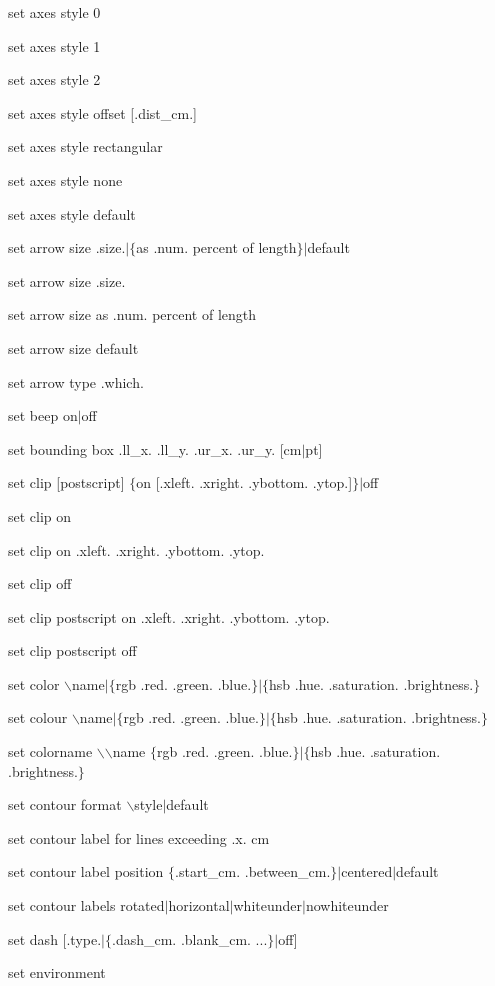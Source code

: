 set axes style 0

set axes style 1

set axes style 2

set axes style offset [.dist\_cm.]

set axes style rectangular

set axes style none

set axes style default

set arrow size .size.$\mid$$\lbrace$as .num. percent of length$\rbrace$$\mid$default

set arrow size .size.

set arrow size as .num. percent of length

set arrow size default

set arrow type .which.

set beep on$\mid$off

set bounding box .ll\_x. .ll\_y. .ur\_x. .ur\_y. [cm$\mid$pt]

set clip [postscript] $\lbrace$on [.xleft. .xright. .ybottom. .ytop.]$\rbrace$$\mid$off

set clip on

set clip on .xleft. .xright. .ybottom. .ytop.

set clip off

set clip postscript on .xleft. .xright. .ybottom. .ytop.

set clip postscript off

set color $\backslash$name$\mid$$\lbrace$rgb .red. .green. .blue.$\rbrace$$\mid$$\lbrace$hsb .hue. .saturation. .brightness.$\rbrace$

set colour $\backslash$name$\mid$$\lbrace$rgb .red. .green. .blue.$\rbrace$$\mid$$\lbrace$hsb .hue. .saturation. .brightness.$\rbrace$

set colorname $\backslash$$\backslash$name $\lbrace$rgb .red. .green. .blue.$\rbrace$$\mid$$\lbrace$hsb .hue. .saturation. .brightness.$\rbrace$

set contour format $\backslash$style$\mid$default

set contour label for lines exceeding .x. cm

set contour label position $\lbrace$.start\_cm. .between\_cm.$\rbrace$$\mid$centered$\mid$default

set contour labels rotated$\mid$horizontal$\mid$whiteunder$\mid$nowhiteunder

set dash [.type.$\mid$$\lbrace$.dash\_cm. .blank\_cm. ...$\rbrace$$\mid$off]

set environment

